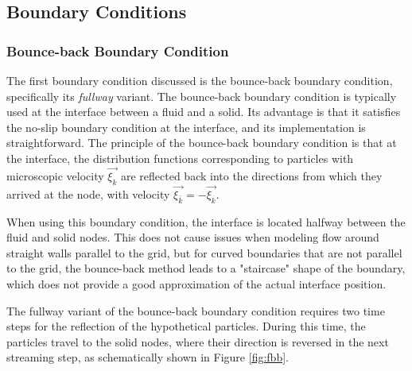 \subsection{Boundary Conditions}


\subsubsection{Bounce-back Boundary Condition}\label{bounce-back}
The first boundary condition discussed is the bounce-back boundary condition, specifically its \textit{fullway} variant. The bounce-back boundary condition is typically used at the interface between a fluid and a solid. Its advantage is that it satisfies the no-slip boundary condition at the interface, and its implementation is straightforward. The principle of the bounce-back boundary condition is that at the interface, the distribution functions corresponding to particles with microscopic velocity \( \vec{\xi_{k}} \) are reflected back into the directions from which they arrived at the node, with velocity \( \vec{\xi_{\bar{k}}} = -\vec{\xi_{k}} \).

When using this boundary condition, the interface is located halfway between the fluid and solid nodes. This does not cause issues when modeling flow around straight walls parallel to the grid, but for curved boundaries that are not parallel to the grid, the bounce-back method leads to a "staircase" shape of the boundary, which does not provide a good approximation of the actual interface position.

The fullway variant of the bounce-back boundary condition requires two time steps for the reflection of the hypothetical particles. During this time, the particles travel to the solid nodes, where their direction is reversed in the next streaming step, as schematically shown in Figure \ref{fig:fbb}.

